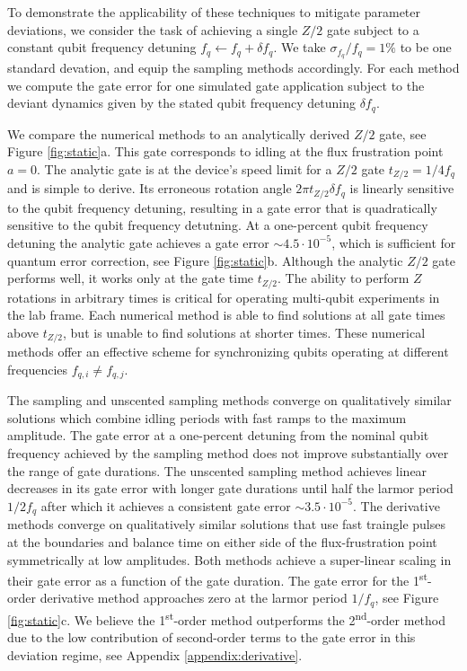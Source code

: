 To demonstrate the applicability of these techniques
to mitigate parameter deviations,
we consider the task of achieving a single $Z/2$
gate subject to a constant qubit frequency detuning
$f_{q} \gets f_{q} + \delta f_{q}$.
We take $\sigma_{f_{q}} / f_{q} = 1\%$ to be one standard devation, and equip
the sampling methods accordingly. For each method we compute the gate error for
one simulated gate application subject to the deviant dynamics given by the
stated qubit frequency detuning $\delta f_{q}$.

We compare the numerical methods
to an analytically derived $Z/2$ gate, see Figure \ref{fig:static}a. This gate corresponds to
idling at the flux frustration point $a = 0$. The analytic gate
is at the device's speed limit for a $Z/2$ gate $t_{Z/2} = 1 / 4 f_{q}$ and
is simple to derive. Its erroneous rotation angle $2 \pi t_{Z/2} \delta f_{q}$ is linearly sensitive to
the qubit frequency detuning, resulting in a gate error that is quadratically sensitive
to the qubit frequency detutning.
At a one-percent
qubit frequency detuning the analytic gate achieves a gate error $\sim 4.5 \cdot 10^{-5}$,
which is sufficient for quantum error correction, see Figure \ref{fig:static}b.
Although the analytic $Z/2$ gate performs well, it works
only at the gate time $t_{Z/2}$. The ability to perform $Z$ rotations in arbitrary times is critical
for operating multi-qubit experiments in the lab frame.
Each numerical method is able to find solutions at
all gate times above $t_{Z/2}$, but is unable to find solutions at shorter times.
These numerical methods offer an effective scheme for synchronizing
qubits operating at different frequencies $f_{q, i} \neq f_{q, j}$.

The sampling and unscented sampling methods
converge on qualitatively similar solutions which combine idling periods
with fast ramps to the maximum amplitude. The gate error at a one-percent
detuning from the nominal qubit frequency achieved
by the sampling method does not improve substantially over the
range of gate durations. The unscented sampling method
achieves linear decreases in its gate error with longer gate durations
until half the larmor period $1 / 2 f_{q}$ after which it achieves a consistent
gate error $\sim 3.5 \cdot 10^{-5}$.
The derivative methods converge on qualitatively similar solutions that
use fast traingle pulses at the boundaries and balance time
on either side of the flux-frustration point symmetrically at low amplitudes.
Both methods achieve a super-linear scaling in their gate error as
a function of the gate duration. The gate error for the 1\textsuperscript{st}-order
derivative method approaches zero at the larmor period $1 / f_{q}$, see Figure \ref{fig:static}c.
We believe the 1\textsuperscript{st}-order method outperforms the 2\textsuperscript{nd}-order
method due to the low contribution of second-order
terms to the gate error in this deviation regime, see Appendix \ref{appendix:derivative}.

